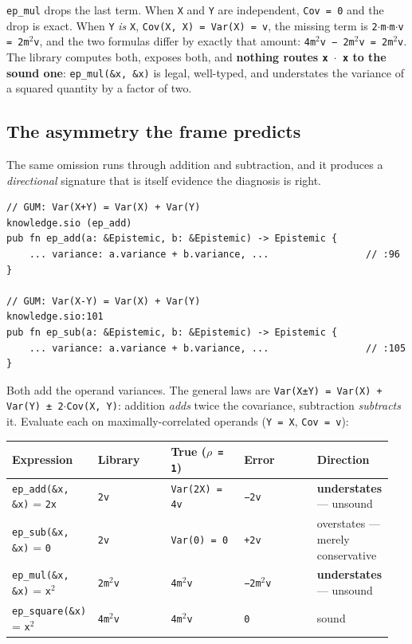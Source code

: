 \documentclass[sigplan,review,anonymous,10pt]{acmart}
\begin{document}
\texttt{ep\_mul} drops the last term. When \texttt{X} and \texttt{Y} are independent, \texttt{Cov = 0} and the drop is exact. When \texttt{Y} \emph{is} \texttt{X}, \texttt{Cov(X, X) = Var(X) = v}, the missing term is \texttt{2$\cdot$m$\cdot$m$\cdot$v = 2m$^{2}$v}, and the two formulas differ by exactly that amount: \texttt{4m$^{2}$v − 2m$^{2}$v = 2m$^{2}$v}. The library computes both, exposes both, and \textbf{nothing routes \texttt{x $\cdot$ x} to the sound one}: \texttt{ep\_mul(\&x, \&x)} is legal, well-typed, and understates the variance of a squared quantity by a factor of two.

\subsection{The asymmetry the frame predicts}

The same omission runs through addition and subtraction, and it produces a \emph{directional} signature that is itself evidence the diagnosis is right.

\begin{lstlisting}
// GUM: Var(X+Y) = Var(X) + Var(Y)                            knowledge.sio (ep_add)
pub fn ep_add(a: &Epistemic, b: &Epistemic) -> Epistemic {
    ... variance: a.variance + b.variance, ...                 // :96
}

// GUM: Var(X-Y) = Var(X) + Var(Y)                            knowledge.sio:101
pub fn ep_sub(a: &Epistemic, b: &Epistemic) -> Epistemic {
    ... variance: a.variance + b.variance, ...                 // :105
}
\end{lstlisting}

Both add the operand variances. The general laws are \texttt{Var(X±Y) = Var(X) + Var(Y) ± 2$\cdot$Cov(X, Y)}: addition \emph{adds} twice the covariance, subtraction \emph{subtracts} it. Evaluate each on maximally-correlated operands (\texttt{Y = X}, \texttt{Cov = v}):

\begin{table}[htbp]\centering\small
\begin{tabular}{p{0.19\linewidth}p{0.19\linewidth}p{0.19\linewidth}p{0.19\linewidth}p{0.19\linewidth}}
\toprule
Expression & Library & True (\texttt{$\rho$ = 1}) & Error & Direction \\
\midrule
\texttt{ep\_add(\&x, \&x)} = \texttt{2x} & \texttt{2v} & \texttt{Var(2X) = 4v} & \texttt{−2v} & \textbf{understates} --- unsound \\
\texttt{ep\_sub(\&x, \&x)} = \texttt{0} & \texttt{2v} & \texttt{Var(0) = 0} & \texttt{+2v} & overstates --- merely conservative \\
\texttt{ep\_mul(\&x, \&x)} = \texttt{x$^{2}$} & \texttt{2m$^{2}$v} & \texttt{4m$^{2}$v} & \texttt{−2m$^{2}$v} & \textbf{understates} --- unsound \\
\texttt{ep\_square(\&x)} = \texttt{x$^{2}$} & \texttt{4m$^{2}$v} & \texttt{4m$^{2}$v} & \texttt{0} & sound \\
\bottomrule
\end{tabular}
\end{table}
\end{document}
